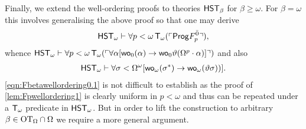 \documentclass[UKenglish,cleveref,DIV=12]{scrartcl}
\theoremstyle{definition}
\theoremstyle{definition}
\begin{document}
Finally, we extend the well-ordering proofs to theories $\mathsf{HST}_\beta$ for
$\beta\ge\omega$. For $\beta=\omega$ this involves generalising the above proof
so that one may derive
\begin{align}\label{eqn:Fbetawellordering0.1}
  \mathsf{HST}_\omega\vdash\forall p<\omega\,\mathsf{T}_\omega(\ulcorner{\mathsf{Prog}F_p^{\bar0}}\urcorner),
\end{align}
whence $\mathsf{HST}_\omega \vdash\forall
p<\omega\,\mathsf{T}_\omega(\ulcorner{\forall\alpha[\mathsf{wo}_{0}(\alpha)\rightarrow\mathsf{wo}_{0}
\vartheta(\Omega^p\cdot\alpha)]}\urcorner)$ and also
\begin{align*}
  \mathsf{HST}_\omega\vdash \forall\sigma<\Omega^\omega[\mathsf{wo}_\omega(\sigma^*)\rightarrow
  \mathsf{wo}_\omega(\vartheta\sigma))].
\end{align*}
\eqref{eqn:Fbetawellordering0.1} is not difficult to establish as the proof of
\cref{lem:Fpwellordering1} is clearly uniform in $p<\omega$ and thus can be
repeated under a $\mathsf{T}_\omega$ predicate in $\mathsf{HST}_\omega$. But in order to lift the
construction to arbitrary $\beta\in\mathrm{OT}_\Omega\cap\Omega$ we require a more
general argument.
\end{document}
